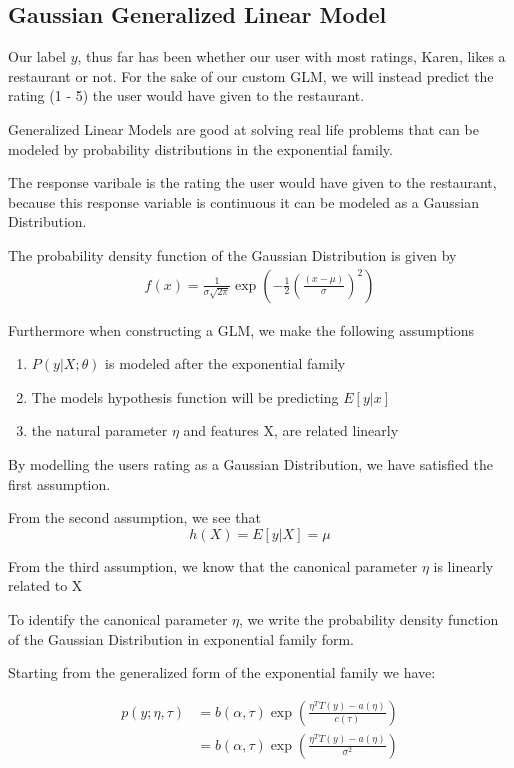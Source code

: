 \documentclass{sigchi}
\begin{document}
\subsection{Gaussian Generalized Linear Model}
Our label $y$, thus far has been whether our user with most ratings, Karen, likes a restaurant or not. 
For the sake of our custom GLM, we will instead predict the rating (1 - 5) the user would have given to the restaurant.

Generalized Linear Models are good at solving real life problems that can be modeled by probability distributions in the exponential family.

The response varibale is the rating the user would have given to the restaurant, because this response variable is continuous it can be modeled as a Gaussian Distribution.

The probability density function of the Gaussian Distribution is given by
\begin{align*}
  f(x) = \frac{1}{\sigma\sqrt{2\pi}} \exp\left(-\frac{1}{2} \left(\frac{(x - \mu)}{\sigma}\right)^2\right)
\end{align*}

Furthermore when constructing a GLM, we make the following assumptions

\begin{enumerate}
    \item $P(y|X; \theta)$ is modeled after the exponential family
    \item The models hypothesis function will be predicting $E[y|x]$
    \item the natural parameter $\eta$ and features X, are related linearly
\end{enumerate}

By modelling the users rating as a Gaussian Distribution, we have satisfied the first assumption.

From the second assumption, we see that $$h(X) = E[y|X] = \mu$$

From the third assumption, we know that the canonical parameter $\eta$ is linearly related to X

To identify the canonical parameter $\eta$, we write the probability density function of the Gaussian Distribution in exponential family form. 

Starting from the generalized form of the exponential family we have:

\begin{align*}
  p(y; \eta, \tau) &= b(\alpha, \tau) \exp\left(\frac{\eta^T T(y) - a(\eta)}{c(\tau)}\right) \\
   &= b(\alpha, \tau) \exp\left(\frac{\eta^T T(y) - a(\eta)}{\sigma^2}\right) \\
\end{align*}
\end{document}

